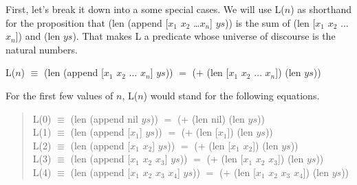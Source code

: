 First, let's break it down into a some special cases.
We will use L($n$) as shorthand for the proposition that
\textsf{(len (append [$x_1$ $x_2$ \dots $x_n$] $ys$))}
is the sum of \textsf{(len [$x_1$ $x_2$ $\dots$ $x_n$])} and \textsf{(len $ys$)}.
That makes L a predicate whose universe of discourse is
the natural numbers.

\label{additive-concat-law-predicate}
\begin{center}
L($n$) $\equiv$ \textsf{(len (append [$x_1$ $x_2$ $\dots$ $x_n$] $ys$))} $=$
\textsf{(+ (len [$x_1$ $x_2$ $\dots$ $x_n$]) (len $ys$))}
\end{center}

For the first few values of $n$, L($n$) would stand for the following equations.
\begin{quote}
L(0) $\equiv$ \textsf{(len (append nil $ys$))} $=$ \textsf{(+ (len nil) (len $ys$))} \\
L(1) $\equiv$ \textsf{(len (append [$x_1$] $ys$))} $=$ \textsf{(+ (len [$x_1$]) (len $ys$))} \\
L(2) $\equiv$ \textsf{(len (append [$x_1$ $x_2$] $ys$))} $=$ \textsf{(+ (len [$x_1$ $x_2$]) (len $ys$))} \\
L(3) $\equiv$ \textsf{(len (append [$x_1$ $x_2$ $x_3$] $ys$))} $=$ \textsf{(+ (len [$x_1$ $x_2$ $x_3$]) (len $ys$))} \\
L(4) $\equiv$ \textsf{(len (append [$x_1$ $x_2$ $x_3$ $x_4$] $ys$))} $=$ \textsf{(+ (len [$x_1$ $x_2$ $x_3$ $x_4$]) (len $ys$))}
\end{quote}


